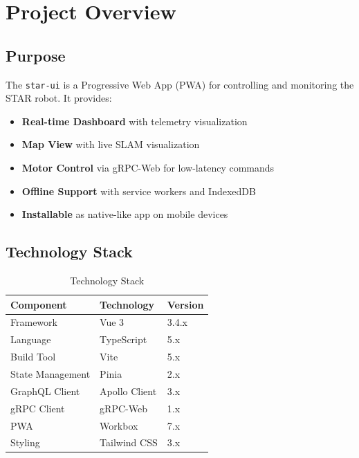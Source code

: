 \section{Project Overview}

\subsection{Purpose}

The \texttt{star-ui} is a Progressive Web App (PWA) for controlling and monitoring the STAR robot. It provides:

\begin{itemize}
    \item \textbf{Real-time Dashboard} with telemetry visualization
    \item \textbf{Map View} with live SLAM visualization
    \item \textbf{Motor Control} via gRPC-Web for low-latency commands
    \item \textbf{Offline Support} with service workers and IndexedDB
    \item \textbf{Installable} as native-like app on mobile devices
\end{itemize}

\subsection{Technology Stack}

\begin{table}[H]
\centering
\begin{tabular}{|l|l|l|}
\hline
\textbf{Component} & \textbf{Technology} & \textbf{Version} \\
\hline
Framework & Vue 3 & 3.4.x \\
Language & TypeScript & 5.x \\
Build Tool & Vite & 5.x \\
State Management & Pinia & 2.x \\
GraphQL Client & Apollo Client & 3.x \\
gRPC Client & gRPC-Web & 1.x \\
PWA & Workbox & 7.x \\
Styling & Tailwind CSS & 3.x \\
\hline
\end{tabular}
\caption{Technology Stack}
\end{table}

